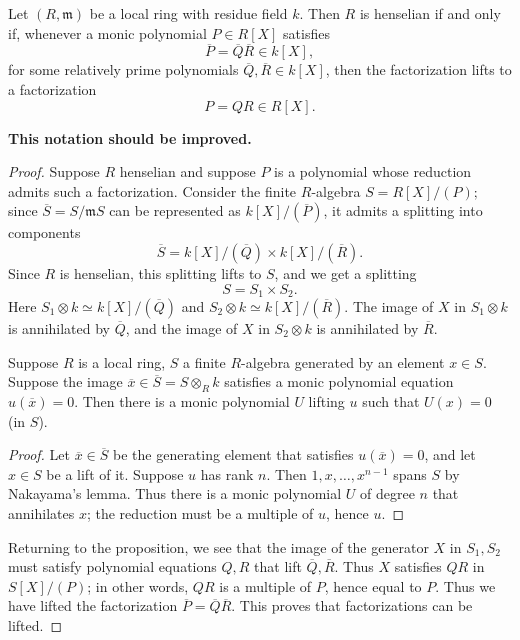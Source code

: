 \begin{proposition}  \label{factorcriterion}
Let $(R, \mathfrak{m})$ be a local ring with residue field $k$. Then $R$ is henselian if and only if,
whenever a monic polynomial $P \in R[X]$ satisfies
\[ \overline{P} = \overline{Q}\overline{R} \in k[X], \]
for some relatively prime polynomials $\overline{Q}, \overline{R} \in k[X]$,
then the factorization lifts to a factorization 
\[ P = QR \in R[X].  \]
\end{proposition} 
\textbf{This notation should be improved.}
\begin{proof} 
Suppose $R$ henselian and suppose $P$ is a polynomial whose reduction admits
such a factorization.
Consider the finite $R$-algebra
\( S = R[X]/(P);  \)
since $\overline{S } = S/\mathfrak{m}S $ can be represented as
$k[X]/(\overline{P})$, it admits a splitting into components
\[ \overline{S} = k[X]/(\overline{Q}) \times k[X]/(\overline{R}).  \]
Since $R$ is henselian, this splitting lifts to $S$, and we get a splitting
\[ S = S_1 \times S_2.  \]
Here $S_1 \otimes k \simeq k[X]/(\overline{Q})$ and $S_2 \otimes k \simeq
k[X]/(\overline{R})$. 
The image of $X$ in $S_1 \otimes k$ is annihilated by $\overline{Q}$, and the
image of $X$ in $S_2 \otimes k$ is annihilated by $\overline{R}$.

\begin{lemma} 
Suppose $R$ is a local ring, $S$ a finite $R$-algebra generated
by an element $x \in S$. Suppose the image $\overline{x} \in \overline{S}=S
\otimes_R
k$ satisfies a monic polynomial equation $u(\overline{x}) = 0$. Then
there is a monic polynomial $U$ lifting $u$ such that $U(x) = 0$ (in $S$). \end{lemma} 
\begin{proof} 
Let $\overline{x} \in \overline{S}$ be the generating element that satisfies
$u(\overline{x})=0$, and let $x \in S$ be a lift of it.  Suppose $u$ has
rank $n$. Then $1, x, \dots,
x^{n-1}$ spans $S$ by Nakayama's lemma. Thus there is a monic polynomial $U$ of
degree $n$ that annihilates $x$; the reduction must be a multiple of $u$,
hence $u$.\end{proof}


Returning to the proposition, we see that the image of the generator $X$ in $S_1, S_2$ 
must satisfy polynomial equations $Q, R$ that lift $\overline{Q},
\overline{R}$. Thus $X$ satisfies $QR$ in $S[X]/(P)$; in other words, $QR$ is a
multiple of $P$, hence equal to $P$. Thus we have lifted the factorization
$\overline{P} = \overline{Q} \overline{R}$.
This proves that factorizations can be lifted.


\end{proof}
